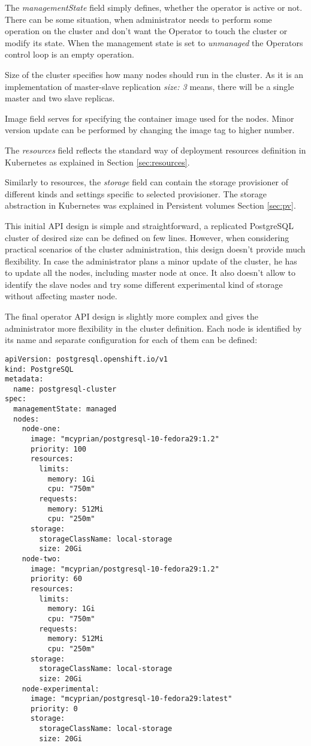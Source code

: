 \documentclass[
  digital, %
  twoside, %
  table,   %
  lof,     %
  lot,     %
]{fithesis3}
\begin{document}
The \textit{managementState} field simply defines, whether the operator is active or not. There can be some situation, when administrator needs to perform some operation on the cluster and don't want the Operator to touch the cluster or modify its state. When the management state is set to \textit{unmanaged} the Operators control loop is an empty operation.

Size of the cluster specifies how many nodes should run in the cluster. As it is an implementation of master-slave replication \textit{size: 3} means, there will be a single master and two slave replicas.

Image field serves for specifying the container image used for the nodes. Minor version update can be performed by changing the image tag to higher number.

The \textit{resources} field reflects the standard way of deployment resources definition in Kubernetes as explained in Section \ref{sec:resources}.

Similarly to resources, the \textit{storage} field can contain the storage provisioner of different kinds and settings specific to selected provisioner. The storage abstraction in Kubernetes was explained in Persistent volumes Section \ref{sec:pv}.

This initial API design is simple and straightforward, a replicated PostgreSQL cluster of desired size can be defined on few lines. However, when considering practical scenarios of the cluster administration, this design doesn't provide much flexibility. In case the administrator plans a minor update of the cluster, he has to update all the nodes, including master node at once. It also doesn't allow to identify the slave nodes and try some different experimental kind of storage without affecting master node.

The final operator API design is slightly more complex and gives the administrator more flexibility in the cluster definition. Each node is identified by its name and separate configuration for each of them can be defined:

\begin{lstlisting}
apiVersion: postgresql.openshift.io/v1
kind: PostgreSQL
metadata:
  name: postgresql-cluster
spec:
  managementState: managed
  nodes:
    node-one:
      image: "mcyprian/postgresql-10-fedora29:1.2"
      priority: 100
      resources:
        limits:
          memory: 1Gi
          cpu: "750m"
        requests:
          memory: 512Mi
          cpu: "250m"
      storage:
        storageClassName: local-storage
        size: 20Gi
    node-two:
      image: "mcyprian/postgresql-10-fedora29:1.2"
      priority: 60
      resources:
        limits:
          memory: 1Gi
          cpu: "750m"
        requests:
          memory: 512Mi
          cpu: "250m"
      storage:
        storageClassName: local-storage
        size: 20Gi
    node-experimental:
      image: "mcyprian/postgresql-10-fedora29:latest"
      priority: 0
      storage:
        storageClassName: local-storage
        size: 20Gi
\end{lstlisting}
\end{document}
